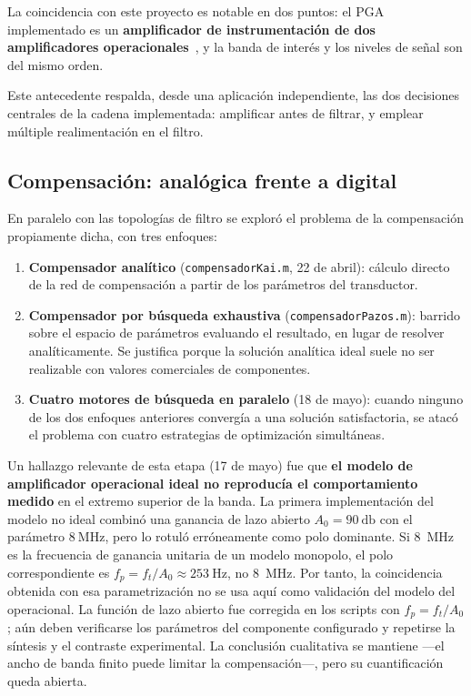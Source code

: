 La coincidencia con este proyecto es notable en dos puntos: el PGA implementado es un
\textbf{amplificador de instrumentaci\'on de dos amplificadores
operacionales}~\cite{CypressAN60319}, y la banda de inter\'es y los niveles de se\~nal son
del mismo orden.

Este antecedente respalda, desde una aplicaci\'on independiente, las dos decisiones
centrales de la cadena implementada: amplificar antes de filtrar, y emplear m\'ultiple
realimentaci\'on en el filtro.

\subsection{Compensaci\'on: anal\'ogica frente a digital}

En paralelo con las topolog\'ias de filtro se explor\'o el problema de la compensaci\'on
propiamente dicha, con tres enfoques:

\begin{enumerate}[itemsep=0.2em]
    \item \textbf{Compensador anal\'itico} (\texttt{compensadorKai.m}, 22 de abril):
    c\'alculo directo de la red de compensaci\'on a partir de los par\'ametros del transductor.
    \item \textbf{Compensador por b\'usqueda exhaustiva} (\texttt{compensadorPazos.m}):
    barrido sobre el espacio de par\'ametros evaluando el resultado, en lugar de resolver
    anal\'iticamente. Se justifica porque la soluci\'on anal\'itica ideal suele no ser
    realizable con valores comerciales de componentes.
    \item \textbf{Cuatro motores de b\'usqueda en paralelo} (18 de mayo): cuando ninguno de
    los dos enfoques anteriores converg\'ia a una soluci\'on satisfactoria, se atac\'o el
    problema con cuatro estrategias de optimizaci\'on simult\'aneas.
\end{enumerate}

Un hallazgo relevante de esta etapa (17 de mayo) fue que \textbf{el modelo de
amplificador operacional ideal no reproduc\'ia el comportamiento medido} en el extremo
superior de la banda. La primera implementaci\'on del modelo no ideal combin\'o una
ganancia de lazo abierto $A_0=\SI{90}{\decibel}$ con el par\'ametro
$\SI{8}{\mega\hertz}$, pero lo rotul\'o err\'oneamente como polo dominante. Si
\SI{8}{\mega\hertz} es la frecuencia de ganancia unitaria de un modelo monopolo, el polo
correspondiente es $f_p=f_t/A_0\approx\SI{253}{\hertz}$, no \SI{8}{\mega\hertz}. Por
tanto, la coincidencia obtenida con esa parametrizaci\'on no se usa aqu\'i como validaci\'on
del modelo del operacional. La funci\'on de lazo abierto fue corregida en los scripts con
$f_p=f_t/A_0$; a\'un deben verificarse los par\'ametros del componente configurado y repetirse
la s\'intesis y el contraste experimental. La conclusi\'on cualitativa se mantiene ---el ancho de banda finito puede
limitar la compensaci\'on---, pero su cuantificaci\'on queda abierta.

